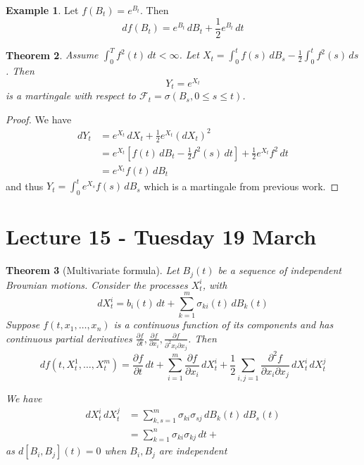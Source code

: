 \documentclass[10pt, oneside, reqno]{amsart}
\theoremstyle{plain}%
\newtheorem{thm}{Theorem}[section]
\theoremstyle{definition}
\newtheorem{exmp}[thm]{Example}
\theoremstyle{remark}
\newcommand{\sigf}{\mathcal{F}}
\begin{document}
\begin{exmp}
    Let $f(B_t) = e^{B_t}$. Then \[
        df(B_t) = e^{B_t} \, dB_t + \frac{1}{2} e^{B_t} \, dt
    \]
\end{exmp}

\begin{thm}
    Assume $\int_0^T f^2(t)\, dt < \infty$.  Let $X_t = \int_0^t f(s) \, dB_s - \frac{1}{2}\int_0^t f^2(s) \, ds$.  Then \[
        Y_t = e^{X_t}
    \]  is a martingale with respect to $\sigf_t = \sigma(B_s, 0 \leq s \leq t)$. 
\end{thm}
\begin{proof}
    We have \begin{align*}
        dY_t    &= e^{X_t} \, dX_t + \frac{1}{2} e^{X_t} (dX_t)^2 \\
                &= e^{X_t}[f(t) \, dB_t - \frac{1}{2} f^2(s) \, dt] + \frac{1}{2} e^{X_t} f^2 \, dt \\
                &= e^{X_t} f(t) \, dB_t
    \end{align*} and thus $Y_t = \int_0^t e^{X_s} f(s) \, dB_s$ which is a martingale from previous work.
\end{proof}

\section{Lecture 15 - Tuesday 19 March} %
\label{sec:lecture_15_tuesday_19_march}

\begin{thm}[Multivariate \itos formula]
    Let $B_j(t)$ be a sequence of independent Brownian motions.  Consider the \ito processes $X_t^i$, with \[
        dX_t^i = b_i(t) \, dt + \sum_{k=1}^m \sigma_{ki}(t) \, dB_k(t)
    \]  Suppose $f(t, x_1, \dots, x_n)$ is a continuous function of its components and has continuous partial derivatives $\frac{\partial f}{\partial t}, \frac{\partial f}{\partial x_i}, \frac{\partial f}{\partial^2 x_i \partial x_j}$.  Then \[
        df(t, X_t^1, \dots, X_t^m) = \frac{\partial f}{\partial t} \, dt + \sum_{i=1}^m \frac{\partial f}{\partial x_i} \, dX_t^i + \frac{1}{2} \sum_{i, j = 1} \frac{\partial^2 f}{\partial x_i \partial x_j} \, dX_t^i \, dX_t^j
    \]
    
    We have \begin{align*}
        dX_t^i \, dX_t^j    &= \sum_{k, s = 1}^m \sigma_{ki} \sigma_{sj} \, dB_k(t) \, dB_{s}(t) \\
                            &= \sum_{k=1}^n \sigma_{ki}\sigma_{kj} \, dt + 
    \end{align*} as $d[B_i, B_j](t) = 0$ when $B_i, B_j$ are independent 
\end{thm}
\end{document}
